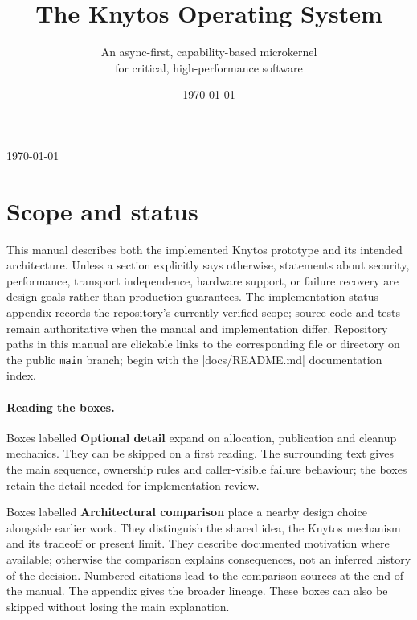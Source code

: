 \documentclass{techdoc}
\date{\today}
\title{The Knytos Operating System}
\subtitle{An async-first, capability-based microkernel\\for critical, high-performance software}
\author{}
\makeatletter
\renewcommand{\maketitle}{%
    \thispagestyle{empty}
    \setlength{\parindent}{0mm}
    \begin{center}
    \vspace*{18mm}
    {\huge\textsc{\@thetitle{}}\par}
    \vspace{8mm}
    {\Large\textsc{\@thesubtitle{}}}
    \vspace*{18mm}
    {\large\@theeditors{}}
    \vfill
        \vspace*{150mm}
    {\large\today}
    \end{center}
}
\makeatother
\begin{document}
    \rhead{}

    \maketitle

    \vfill

    \newpage
    \section*{Scope and status}
    This manual describes both the implemented Knytos prototype and its
    intended architecture. Unless a section explicitly says otherwise,
    statements about security, performance, transport independence, hardware
    support, or failure recovery are design goals rather than production
    guarantees. The implementation-status appendix records the repository's
    currently verified scope; source code and tests remain authoritative when
    the manual and implementation differ. Repository paths in this manual are
    clickable links to the corresponding file or directory on the public
    \texttt{main} branch; begin with the \repofile|docs/README.md|
    documentation index.

    \paragraph*{Reading the boxes.}
    Boxes labelled \textbf{Optional detail} expand on allocation, publication
    and cleanup mechanics. They can be skipped on a first reading. The surrounding
    text gives the main sequence, ownership rules and caller-visible failure
    behaviour; the boxes retain the detail needed for implementation review.

    Boxes labelled \textbf{Architectural comparison} place a nearby design
    choice alongside earlier work. They distinguish the shared idea, the
    Knytos mechanism and its tradeoff or present limit. They describe
    documented motivation where available; otherwise the comparison explains
    consequences, not an inferred history of the decision. Numbered citations
    lead to the comparison sources at the end of the manual. The
     appendix gives the broader lineage.
    These boxes can also be skipped without losing the main explanation.

    \newpage
    \renewcommand\contentsname{Contents}
    \begingroup
    \renewcommand{\mychaptertitlefont}{\fontseries{m}\fontsize{20}{24}\selectfont}
    \tableofcontents
    \endgroup
    \newpage
\end{document}
